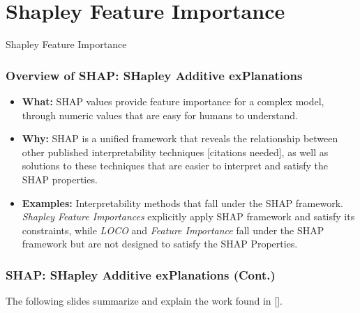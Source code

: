 \section{Shapley Feature Importance}

\begin{frame}[c]
\Huge{\centerline{Shapley Feature Importance}}
\end{frame}


\begin{frame}\frametitle{Overview of SHAP: SHapley Additive exPlanations}

	\begin{itemize}
		\item \textbf{What:} SHAP values provide feature importance for a complex model, through numeric values that are easy for humans to understand. 
		\bigskip
		\item \textbf{Why:} SHAP is a unified framework that reveals the relationship between other published interpretability techniques [citations needed], as well as solutions to these techniques that are easier to interpret and satisfy the SHAP properties. 
		\bigskip
		\item\textbf{Examples:}  Interpretability methods that fall under the SHAP framework. \textit{Shapley Feature Importances} explicitly apply SHAP framework and satisfy its constraints, while \textit{LOCO} and \textit{Feature Importance} fall under the SHAP framework but are not designed to satisfy the SHAP Properties. 
	\end{itemize}
\end{frame}

\begin{frame}\frametitle{SHAP: SHapley Additive exPlanations (Cont.)}

The following slides summarize and explain the work found in [\cite{shapley}].

\end{frame}

